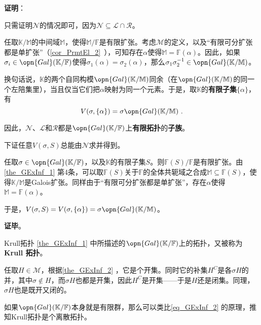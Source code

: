 \textbf{证明}：

只需证明$\mathcal{N}$的情况即可，因为$\mathcal{N}\subseteq \mathcal{L}\cap\mathcal{R}$。

任取$\mathbb{K}/\mathbb{M}$的中间域$\mathbb{M}$，使得$\mathbb{M}/\mathbb{F}$是有限扩张。考虑$\mathcal{M}$的定义，以及“有限可分扩张都是单扩张”（\autoref{cor_PrmtEl_2}~），可知存在$\alpha$使得$\mathbb{M}=\mathbb{F}(\alpha)$。因此，如果$\sigma_i\in\opn{Gal}(\mathbb{K}/\mathbb{F})$使得$\sigma_1(\alpha)=\sigma_2(\alpha)$，那么$\sigma_1\sigma_2^{-1}\in\opn{Gal}(\mathbb{K}/\mathbb{M})$。

换句话说，$\mathbb{K}$的两个自同构模$\opn{Gal}(\mathbb{K}/\mathbb{M})$同余（在$\opn{Gal}(\mathbb{K}/\mathbb{M})$的同一个左陪集里），当且仅当它们把$\alpha$映射为同一个元素。于是，取$\mathbb{K}$的\textbf{有限子集}$\{\alpha\}$，有
\begin{equation}\label{eq_GExInf_2}
V(\sigma, \{\alpha\}) = \sigma \opn{Gal}(\mathbb{K}/\mathbb{M})~.
\end{equation}

因此，$\mathcal{N}$、$\mathcal{L}$和$\mathcal{R}$都是$\opn{Gal}(\mathbb{K}/\mathbb{F})$上\textbf{有限拓扑}的\textbf{子族}。

下证任意$V(\sigma, S)$总能由$\mathcal{N}$求并得到。

任取$\sigma\in\opn{Gal}(\mathbb{K}/\mathbb{F})$，以及$\mathbb{K}$的有限子集$S$。则$\mathbb{F}(S)/\mathbb{F}$是有限扩张。由\autoref{the_GExInf_1} 第4条，可以取$\mathbb{F}(S)$关于$\mathbb{F}$的全体共轭域之合成$\mathbb{M}\subseteq\mathbb{F}(S)$，使得$\mathbb{K}/\mathbb{M}$是Galois扩张。同样由于“有限可分扩张都是单扩张”，存在$\alpha$使得$\mathbb{M}=\mathbb{F}(\alpha)$。

于是，$V(\sigma, S)=V(\sigma, \{\alpha\})=\sigma \opn{Gal}(\mathbb{K}/\mathbb{M})$。

\textbf{证毕}。

\begin{definition}{Krull拓扑}\label{def_GExInf_1}
\autoref{the_GExInf_1} 中所描述的$\opn{Gal}(\mathbb{K}/\mathbb{F})$上的拓扑，又被称为\textbf{Krull 拓扑}。
\end{definition}

任取$H\in\mathcal{M}$，根据\autoref{the_GExInf_2} ，它是个开集。同时它的补集$H^C$是各$\sigma H$的并，其中$\sigma\not\in H$，而$\sigma H$也都是开集，因此$H^C$是开集——于是$H$还是闭集。同理，$\sigma H$也是既开又闭的。

如果$\opn{Gal}(\mathbb{K}/\mathbb{F})$本身就是有限群，那么可以类比\autoref{eq_GExInf_2} 的原理，推知Krull拓扑是个离散拓扑。


